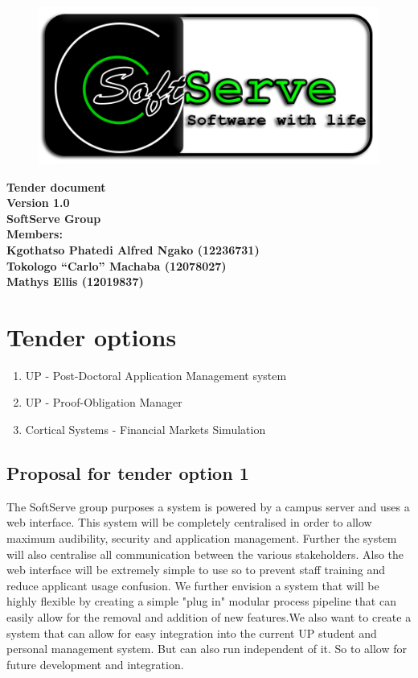 \documentclass[12pt]{article}
\newcommand{\Title}{Tender document} %
\begin{document}
	\begin{center}%
		\begin{figure}[ht!]
			\centering
			\includegraphics{./Pictures/logo.png}
		\end{figure}
		\LARGE \bf \Title \\
		{\bf Version 1.0}\\[4em]
		\LARGE {\bf SoftServe Group }\\[1em]
		\LARGE {\bf Members:}\\[2em]
		\large
		Kgothatso Phatedi Alfred Ngako		(12236731) \\[1em]
		Tokologo “Carlo” Machaba			(12078027) \\[1em]
		Mathys Ellis						(12019837) \\[8em]
			    
	\end{center}%
				
	\newpage
		\tableofcontents
			
	\newpage
	\section{Tender options}
	\begin{enumerate}
		\item UP - Post-Doctoral Application Management system
		\item UP - Proof-Obligation Manager
		\item Cortical Systems - Financial Markets Simulation
	\end{enumerate}	
	
	\subsection{Proposal for tender option 1}
		The SoftServe group purposes a system is powered by a campus server and uses a web interface.
		This system will be completely centralised in order to allow maximum audibility, security and application management.
		Further the system will also centralise all communication between the various stakeholders. Also the web interface will be extremely simple to use so to prevent staff training and reduce applicant usage confusion. We further envision a system that will be highly flexible by creating a simple "plug in" modular process pipeline that can easily allow for the removal and addition of new features.We also want to create a system that can allow for easy integration into the current UP student and personal management system. But can also run independent of it. So to allow for future development and integration.
		
\end{document}
